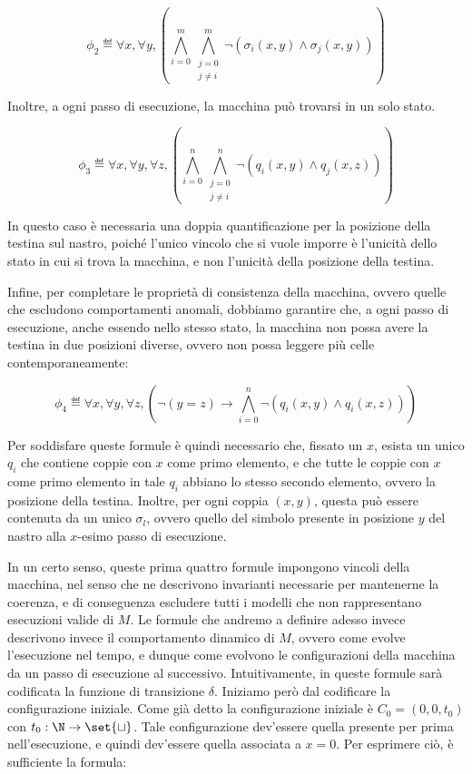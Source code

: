 \begin{equation}
  \phi_2 \eqdef \forall x, \forall y, \left(\bigwedge_{i=0}^{m} \bigwedge_{\substack{j=0\\j \neq i}}^{m} \neg\left(\sigma_i\left(x,y\right) \land \sigma_j\left(x,y\right)\right)\right)
\end{equation}

Inoltre, a ogni passo di esecuzione, la macchina può trovarsi in un solo stato.

\begin{equation}
  \phi_3 \eqdef \forall x, \forall y, \forall z, \left(\bigwedge_{i=0}^{n} \bigwedge_{\substack{j=0\\j \neq i}}^{n} \neg\left(q_i\left(x,y\right) \land q_j\left(x,z\right)\right)\right)
\end{equation}

In questo caso è necessaria una doppia quantificazione per la posizione della testina sul nastro, poiché l'unico vincolo che si vuole imporre è l'unicità dello stato in cui si trova la macchina, e non l'unicità della posizione della testina.

Infine, per completare le proprietà di consistenza della macchina, ovvero quelle che escludono comportamenti anomali, dobbiamo garantire che, a ogni passo di esecuzione, anche essendo nello stesso stato, la macchina non possa avere la testina in due posizioni diverse, ovvero non possa leggere più celle contemporaneamente:

\begin{equation}
  \phi_4 \eqdef \forall x, \forall y, \forall z, \left(\neg(y = z)\to \bigwedge_{i=0}^{n} \neg\left(q_i\left(x,y\right) \land q_i\left(x,z\right)\right)\right)
\end{equation}

Per soddisfare queste formule è quindi necessario che, fissato un \(x\), esista un unico \(q_i\) che contiene coppie con \(x\) come primo elemento, e che tutte le coppie con \(x\) come primo elemento in tale \(q_i\) abbiano lo stesso secondo elemento, ovvero la posizione della testina. Inoltre, per ogni coppia \((x,y)\), questa può essere contenuta da un unico \(\sigma_l\), ovvero quello del simbolo presente in posizione \(y\) del nastro alla \(x\)-esimo passo di esecuzione.

In un certo senso, queste prima quattro formule impongono vincoli  della macchina, nel senso che ne descrivono invarianti necessarie per mantenerne la coerenza, e di conseguenza escludere tutti i modelli che non rappresentano esecuzioni valide di \(M\). Le formule che andremo a definire adesso invece descrivono invece il comportamento dinamico di \(M\), ovvero come evolve l'esecuzione nel tempo, e dunque come evolvono le configurazioni della macchina da un passo di esecuzione al successivo. Intuitivamente, in queste formule sarà codificata la funzione di transizione \(\delta\). Iniziamo però dal codificare la configurazione iniziale. Come già detto la configurazione iniziale è \(C_0 = (0,0,t_0)\) con \(t_0 : \N \to \set{\sqcup}\). Tale configurazione dev'essere quella presente per prima nell'esecuzione, e quindi dev'essere quella associata a \(x = 0\). Per esprimere ciò, è sufficiente la formula:

